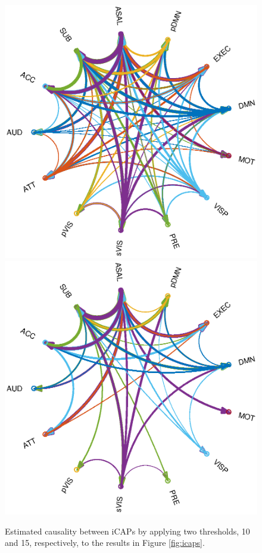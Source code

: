 \documentclass[10pt,conference,compsocconf]{IEEEtran}
\begin{document}
\begin{figure}%
    \centering
    \vspace{-3mm}
    \includegraphics[scale=0.5]{images/th10.eps}%
    \vspace{-10mm}
    \includegraphics[scale=0.5]{images/th15.eps}
    \vspace{-10mm}
    \caption{Estimated causality between iCAPs by applying two thresholds, 10 and 15, respectively, to the results in Figure \ref{fig:icaps}.}%
    \label{fig:causal}%
\end{figure}
\end{document}
